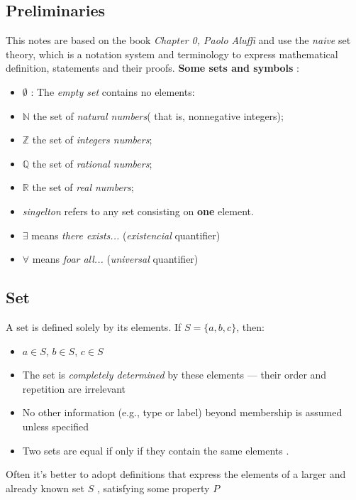 \documentclass[10pt]{article}
\theoremstyle{plain}
\theoremstyle{definition}
\begin{document}
	\subsection*{Preliminaries}
	This notes are based on the book \textit{Chapter 0, Paolo Aluffi} and use the \textit{naive} set theory, which is a notation system and terminology to express mathematical definition, statements and their proofs. \vspace{0.5cm}
	\textbf{Some sets and symbols} :
	\begin{itemize}
		\item $\emptyset$ : The \textit{empty set } contains no elements:
		\item  $\mathbb{N}$ the set of \textit{natural numbers}( that is, nonnegative integers);
		\item  $\mathbb{Z}$ the set of \textit{integers numbers};
		\item  $\mathbb{Q}$ the set of \textit{rational numbers};
		\item  $\mathbb{R}$ the set of \textit{real numbers};
		\item \textit{singelton} refers to any set consisting on \textbf{one} element.
		\item $\exists$ means \textit{there exists...} (\textit{existencial} quantifier)
		\item $\forall$ means \textit{foar all...} (\textit{universal} quantifier)
	\end{itemize}
	
	\subsection*{Set}
	
	A set is defined solely by its elements. If \( S = \{a, b, c\} \), then:
	
	\begin{itemize}
		\item \( a \in S \), \( b \in S \), \( c \in S \)
		\item The set is \emph{completely determined} by these elements — their order and repetition are irrelevant
		\item No other information (e.g., type or label) beyond membership is assumed unless specified
		\item Two sets are equal if only if they contain the same elements .
	\end{itemize}
	 
	 Often it's better to adopt definitions that express the elements of a larger and already known set $S$ , satisfying some property $P$
	 
\end{document}
